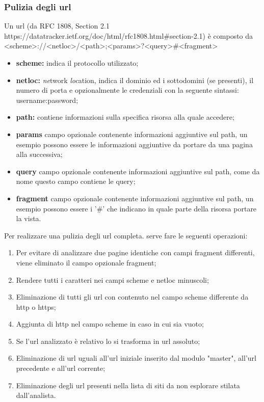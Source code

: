 \subsubsection{Pulizia degli url}
Un url (da RFC 1808, Section 2.1 https://datatracker.ietf.org/doc/html/rfc1808.html\#section-2.1) è composto da \newline
<scheme>://<netloc>/<path>;<params>?<query>\#<fragment>
\newline
\begin{itemize}
	\item \textbf{scheme:} indica il protocollo utilizzato;
	\item \textbf{netloc:} \textit{ne}twork \textit{loc}ation, indica il dominio ed i sottodomini (se presenti), il numero di porta e opzionalmente le credenziali con la seguente sintassi: username:password;
	\item \textbf{path:} contiene informazioni sulla specifica risorsa alla quale accedere;
	\item \textbf{params} campo opzionale contenente informazioni aggiuntive sul path, un esempio possono essere le informazioni aggiuntive da portare da una pagina alla successiva;
	\item \textbf{query} campo opzionale contenente informazioni aggiuntive sul path, come da nome questo campo contiene le query;
	\item \textbf{fragment} campo opzionale contenente informazioni aggiuntive sul path, un esempio possono essere i '\#' che indicano in quale parte della risorsa portare la vista.
\end{itemize}

Per realizzare una pulizia degli url completa. serve fare le seguenti operazioni:
\begin{enumerate}
	\item Per evitare di analizzare due pagine identiche con campi fragment differenti, viene eliminato il campo opzionale fragment;
	\item Rendere tutti i caratteri nei campi scheme e netloc minuscoli;
	\item Eliminazione di tutti gli url con contenuto nel campo scheme differente da http o https;
	\item Aggiunta di http nel campo scheme in caso in cui sia vuoto;
	\item Se l'url analizzato è relativo lo si trasforma in url assoluto;
	\item Eliminazione di url uguali all'url iniziale inserito dal modulo "master", all'url precedente e all'url corrente;
	\item Eliminazione degli url presenti nella lista di siti da non esplorare stilata dall'analista.
\end{enumerate}

